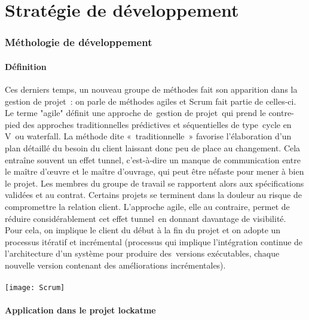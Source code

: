 \part{Stratégie de développement}
\section{Méthologie de développement}
\subsection{Définition}

Ces derniers temps, un nouveau groupe de méthodes fait son apparition dans la
gestion de projet : on parle de méthodes agiles et Scrum fait partie de
celles-ci. Le terme "agile" définit une approche de gestion de projet qui prend
le contre-pied des approches traditionnelles prédictives et séquentielles de
type cycle en V ou waterfall.
La méthode dite « traditionnelle » favorise l’élaboration d’un plan détaillé
du besoin du client laissant donc peu de place au changement. Cela entraîne
souvent un effet tunnel, c’est-à-dire un manque de communication entre le
maître d’œuvre et le maître d’ouvrage, qui peut être néfaste pour mener à bien
le projet. Les membres du groupe de travail se rapportent alors aux
spécifications validées et au contrat. Certains projets se terminent dans la
douleur au risque de compromettre la relation client.
L’approche agile, elle au contraire, permet de réduire considérablement cet
effet tunnel en donnant davantage de visibilité. Pour cela, on implique le
client du début à la fin du projet et on adopte un processus itératif et
incrémental (processus qui implique l'intégration continue de l'architecture
d'un système pour produire des versions exécutables, chaque nouvelle version
contenant des améliorations incrémentales).
\\
\\
\texttt{[image: Scrum]}

\subsection{Application dans le projet lockatme}

